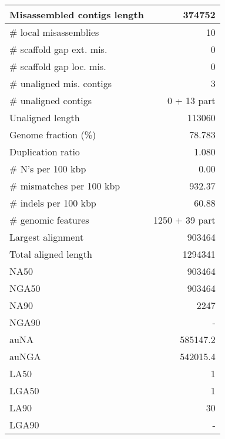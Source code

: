 \documentclass[12pt,a4paper]{article}
\begin{document}
\begin{table}[ht]
\begin{center}
\begin{tabular}{|l*{1}{|r}|}
Misassembled contigs length & 374752 \\ \hline
\# local misassemblies & 10 \\ \hline
\# scaffold gap ext. mis. & 0 \\ \hline
\# scaffold gap loc. mis. & 0 \\ \hline
\# unaligned mis. contigs & 3 \\ \hline
\# unaligned contigs & 0 + 13 part \\ \hline
Unaligned length & 113060 \\ \hline
Genome fraction (\%) & 78.783 \\ \hline
Duplication ratio & 1.080 \\ \hline
\# N's per 100 kbp & 0.00 \\ \hline
\# mismatches per 100 kbp & 932.37 \\ \hline
\# indels per 100 kbp & 60.88 \\ \hline
\# genomic features & 1250 + 39 part \\ \hline
Largest alignment & 903464 \\ \hline
Total aligned length & 1294341 \\ \hline
NA50 & 903464 \\ \hline
NGA50 & 903464 \\ \hline
NA90 & 2247 \\ \hline
NGA90 & - \\ \hline
auNA & 585147.2 \\ \hline
auNGA & 542015.4 \\ \hline
LA50 & 1 \\ \hline
LGA50 & 1 \\ \hline
LA90 & 30 \\ \hline
LGA90 & - \\ \hline
\end{tabular}
\end{center}
\end{table}
\end{document}
